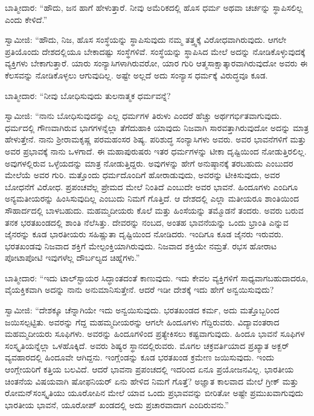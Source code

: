 \vskip 0.1cm

ಬಾತ್ಮೀದಾರ: “ಹೌದು, ಜನ ಹಾಗೆ ಹೇಳುತ್ತಾರೆ. ನೀವು ಅಮೆರಿಕದಲ್ಲಿ ಹೊಸ ಧರ್ಮ ಅಥವಾ ಚರ್ಚನ್ನು ಸ್ಥಾಪಿಸಲಿಲ್ಲ ಎಂದು ಕೇಳಿದೆ.”

\vskip 0.1cm

ಸ್ವಾಮೀಜಿ: “ಹೌದು, ನಿಜ, ಹೊಸ ಸಂಸ್ಥೆಯನ್ನು ಸ್ಥಾಪಿಸುವುದು ನಮ್ಮ ತತ್ತ್ವಕ್ಕೆ ವಿರೋಧವಾಗಿರುವುದು. ಆಗಲೇ ಪ್ರತಿಯೊಂದು ದೇಶದಲ್ಲಿಯೂ ಬೇಕಾದಷ್ಟು ಸಂಸ್ಥೆಗಳಿವೆ. ಸಂಸ್ಥೆಯನ್ನು ಸ್ಥಾಪಿಸಿದ ಮೇಲೆ ಅದನ್ನು ನೋಡಿಕೊಳ್ಳುವುದಕ್ಕೆ ವ್ಯಕ್ತಿಗಳು ಬೇಕಾಗುತ್ತಾರೆ. ಯಾರು ಸಂನ್ಯಾಸಿಗಳಾಗಿರುವರೋ, ಯಾರ ಗುರಿ ಆತ್ಮಸಾಕ್ಷಾತ್ಕಾರವಾಗಿರುವುದೋ ಅವರು ಈ ಕೆಲಸವನ್ನು ನೋಡಿಕೊಳ್ಳಲು ಆಗುವುದಿಲ್ಲ. ಅಷ್ಟೇ ಅಲ್ಲದೆ ಅದು ಸಂನ್ಯಾಸ ಧರ್ಮಕ್ಕೆ ವಿರುದ್ಧವೂ ಕೂಡ.

\vskip 0.1cm

ಬಾತ್ಮೀದಾರ: “ನೀವು ಬೋಧಿಸುವುದು ತುಲನಾತ್ಮಕ ಧರ್ಮವನ್ನೆ?

\vskip 0.1cm

ಸ್ವಾಮೀಜಿ: “ನಾನು ಬೋಧಿಸುವುದನ್ನು ಎಲ್ಲ ಧರ್ಮಗಳ ತಿರುಳು ಎಂದರೆ ಹೆಚ್ಚು ಅರ್ಥಗರ್ಭಿತವಾಗುವುದು. ಧರ್ಮದಲ್ಲಿ ಗೌಣವಾಗಿರುವ ಭಾಗಗಳನ್ನೆಲ್ಲಾ ತೆಗೆದುಹಾಕಿ ಯಾವುದು ನಿಜವಾಗಿ ಸಾರವತ್ತಾಗಿರುವುದೋ ಅದನ್ನು ಮಾತ್ರ ಹೇಳುತ್ತೇನೆ. ನಾನು ಶ‍್ರೀರಾಮಕೃಷ್ಣ ಪರಮಹಂಸರ ಶಿಷ್ಯ. ಪರಿಶುದ್ಧ ಸಂನ್ಯಾಸಿಗಳು ಅವರು. ಅವರ ಭಾವನೆಗಳಿಗೆ ಮತ್ತು ಅವರ ಪ್ರಭಾವಕ್ಕೆ ನಾನು ಒಳಗಾದೆ. ಈ ಮಹಾಪುರುಷರು ಇತರ ಧರ್ಮಗಳನ್ನು ಟೀಕಾ ದೃಷ್ಟಿಯಿಂದ ನೋಡುತ್ತಿರಲಿಲ್ಲ. ಅವುಗಳಲ್ಲಿರುವ ಒಳ್ಳೆಯದನ್ನು ಮಾತ್ರ ನೋಡುತ್ತಿದ್ದರು. ಅವುಗಳನ್ನು ಹೇಗೆ ಅನುಷ್ಠಾನಕ್ಕೆ ತರಬಹುದು ಎಂಬುದರ ಮೇಲೆಯೆ ಅವರ ಗುರಿ. ಮತ್ತೊಂದು ಧರ್ಮದೊಂದಿಗೆ ಹೋರಾಡುವುದು, ಅವರನ್ನು ಟೀಕಿಸುವುದು, ಅವರ ಬೋಧನೆಗೆ ವಿರೋಧ. ಪ್ರಪಂಚವೆಲ್ಲ ಪ್ರೇಮದ ಮೇಲೆ ನಿಂತಿದೆ ಎಂಬುದೇ ಅವರ ಭಾವನೆ. ಹಿಂದೂಗಳು ಎಂದಿಗೂ ಅನ್ಯಮತೀಯರನ್ನು ಹಿಂಸಿಸುವುದಿಲ್ಲ ಎಂಬುದು ನಿಮಗೆ ಗೊತ್ತಿದೆ. ಆ ದೇಶದಲ್ಲಿ ಎಲ್ಲಾ ಮತೀಯರೂ ಶಾಂತಿಯಿಂದ ಸೌಹಾರ್ದದಲ್ಲಿ ಬಾಳಬಹುದು. ಮಹಮ್ಮದೀಯರು ಕೊಲೆ ಮತ್ತು ಹಿಂಸೆಯನ್ನು ತಮ್ಮೊಡನೆ ತಂದರು. ಅವರು ಬರುವ ತನಕ ಭರತಖಂಡದಲ್ಲಿ ಶಾಂತಿ ನೆಲೆಸಿತ್ತು. ದೇವರನ್ನು ನಂಬದ, ಅಂತಹ ಭಾವನೆಯನ್ನು ಒಂದು ಭ್ರಾಂತಿ ಎನ್ನುವ ಜೈನರನ್ನು ಕೂಡ ಭಾರತೀಯರು ಸಹಿಷ್ಣುತಾ ದೃಷ್ಟಿಯಿಂದ ನೋಡಿದರು. ಇಂದಿಗೂ ಕೂಡ ಜೈನರು ಇರುವರು. ಭರತಖಂಡವು ನಿಜವಾದ ಶಕ್ತಿಗೆ ಮೇಲ್ಪಂಕ್ತಿಯಾಗಿರುವುದು. ನಿಜವಾದ ಶಕ್ತಿಯೇ ನಮ್ರತೆ. ರಭಸ ಹೋರಾಟ ಪೋಟಾಪೋಟಿ ಇವುಗಳೆಲ್ಲ ದೌರ್ಬಲ್ಯದ ಚಿಹ್ನೆಗಳು.”

ಬಾತ್ಮೀದಾರ: “ಇದು ಟಾಲ್​ಸ್ಟಾಯರ ಸಿದ್ಧಾಂತದಂತೆ ಕಾಣುವುದು. ಇದು ಕೇವಲ ವ್ಯಕ್ತಿಗಳಿಗೆ ಸಾಧ್ಯವಾಗಬಹುದಾದರೂ, ವೈಯಕ್ತಿಕವಾಗಿ ಅದನ್ನು ನಾನು ಅನುಮಾನಿಸುತ್ತೇನೆ. ಆದರೆ ಇಡೀ ದೇಶಕ್ಕೆ ಇದು ಹೇಗೆ ಅನ್ವಯಿಸುವುದು?

\vskip 0.1cm

ಸ್ವಾಮೀಜಿ: “ದೇಶಕ್ಕೂ ಚೆನ್ನಾಗಿಯೇ ಇದು ಅನ್ವಯಿಸುವುದು. ಭರತಖಂಡದ ಕರ್ಮ, ಅದು ಮತ್ತೊಬ್ಬರಿಂದ ಜಯಿಸಲ್ಪಟ್ಟಿತು. ಅವರನ್ನು ಗೆದ್ದ ಮಹಮ್ಮದೀಯರನ್ನು ಆಗಲೇ ಹಿಂದೂಗಳು ಗೆದ್ದಿರುವರು. ವಿದ್ಯಾವಂತರಾದ ಮಹಮ್ಮದೀಯರು ಸೂಫಿಗಳು. ಅವರನ್ನು ಹಿಂದೂಗಳಿಂದ ಪ್ರತ್ಯೇಕಿಸಲು ಕಷ್ಟವಾಗುವುದು. ಹಿಂದೂ ಭಾವನೆ ಸೂಫಿಗಳ ಸಂಸ್ಕೃತಿಯನ್ನೆಲ್ಲಾ ಒಳಹೊಕ್ಕಿದೆ. ಅವರು ಶಿಷ್ಯರ ಸ್ಥಾನದಲ್ಲಿರುವರು. ಮೊಗಲ ಚಕ್ರವರ್ತಿಯಾದ ಪ್ರಖ್ಯಾತ ಅಕ್ಬರ್​ ವ್ಯವಹಾರದಲ್ಲಿ ಹಿಂದೂವೇ ಆಗಿದ್ದನು. ಇಂಗ್ಲೆಂಡನ್ನು ಕೂಡ ಭರತಖಂಡ ಕ್ರಮೇಣ ಜಯಿಸುವುದು. ಇಂದು ಆಂಗ್ಲೇಯರಿಗೆ ಕತ್ತಿಯ ಬಲವಿದೆ. ಆದರೆ ಭಾವನಾ ಪ್ರಪಂಚದಲ್ಲಿ ಇದರಿಂದ ಏನೂ ಪ್ರಯೋಜನವಿಲ್ಲ. ಭಾರತೀಯ ಚಿಂತನೆಯ ವಿಷಯವಾಗಿ ಷೋಫನಿಯರ್​ ಏನು ಹೇಳಿದ ನಿಮಗೆ ಗೊತ್ತೆ? ಅಜ್ಞಾತ ಕಾಲವಾದ ಮೇಲೆ ಗ್ರೀಕ್​ ಮತ್ತು ರೋಮನ್​ ಸಂಸ್ಕೃತಿಯು ಯೂರೋಪಿನ ಮೇಲೆ ಯಾವ ಒಂದು ಪ್ರಭಾವವನ್ನು ಬೀರಿತೋ ಅಷ್ಟೇ ಪ್ರಮುಖವಾಗುವುದು ಭಾರತೀಯ ಭಾವನೆ, ಯೂರೋಪ್​ ಖಂಡದಲ್ಲಿ ಅದು ಪ್ರಚಾರವಾದಾಗ ಎಂದಿರುವನು.”

